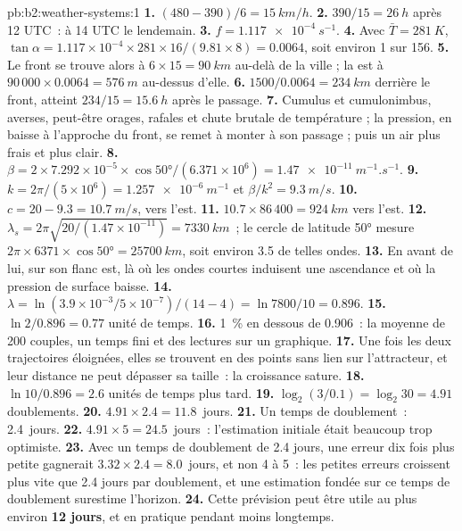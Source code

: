 \begin{solution}{pb:b2:weather-systems:1}
\textbf{1.} $(480 - 390)/6 = \qty{15}{km/h}$.
\textbf{2.} $390/15 = \qty{26}{h}$ après 12 UTC~: à 14 UTC le lendemain.
\textbf{3.} $f = \qty{1.117e-4}{s^{-1}}$.
\textbf{4.} Avec $\bar T = \qty{281}{K}$, $\tan\alpha = 1.117 \times 10^{-4} \times 281 \times
16/(9.81 \times 8) = 0.0064$, soit environ 1 sur 156.
\textbf{5.} Le front se trouve alors à $6 \times 15 = \qty{90}{km}$ au-delà de la ville ; la  est
à $90\,000 \times 0.0064 = \qty{576}{m}$ au-dessus d'elle.
\textbf{6.} $1500/0.0064 = \qty{234}{km}$ derrière le front, atteint $234/15 = \qty{15.6}{h}$ après
le passage.
\textbf{7.} Cumulus et cumulonimbus, averses, peut-être orages, rafales et chute brutale de
température ; la pression, en baisse à l'approche du front, se remet à monter à son passage ; puis
un air plus frais et plus clair.
\textbf{8.} $\beta = 2 \times 7.292 \times 10^{-5} \times \cos\ang{50}/(6.371 \times 10^6) =
\qty{1.47e-11}{m^{-1}.s^{-1}}$.
\textbf{9.} $k = 2\pi/(5 \times 10^6) = \qty{1.257e-6}{m^{-1}}$ et $\beta/k^2 = \qty{9.3}{m/s}$.
\textbf{10.} $c = 20 - 9.3 = \qty{10.7}{m/s}$, vers l'est.
\textbf{11.} $10.7 \times 86\,400 = \qty{924}{km}$ vers l'est.
\textbf{12.} $\lambda_s = 2\pi\sqrt{20/(1.47 \times 10^{-11})} = \qty{7330}{km}$~; le cercle de
latitude \ang{50} mesure $2\pi \times 6371 \times \cos\ang{50} = \qty{25700}{km}$, soit environ 3.5
de telles ondes.
\textbf{13.} En avant de lui, sur son flanc est, là où les ondes courtes induisent une ascendance et où la
pression de surface baisse.
\textbf{14.} $\lambda = \ln(3.9 \times 10^{-3}/5 \times 10^{-7})/(14 - 4) = \ln 7800/10 = 0.896$.
\textbf{15.} $\ln 2/0.896 = 0.77$ unité de temps.
\textbf{16.} \qty{1}{\percent} en dessous de 0.906~: la moyenne de 200 couples, un temps fini et des lectures sur
un graphique.
\textbf{17.} Une fois les deux trajectoires éloignées, elles se trouvent en des points sans lien sur l'attracteur, et
leur distance ne peut dépasser sa taille~: la croissance sature.
\textbf{18.} $\ln 10/0.896 = 2.6$ unités de temps plus tard.
\textbf{19.} $\log_2(3/0.1) = \log_2 30 = 4.91$ doublements.
\textbf{20.} $4.91 \times 2.4 = 11.8$~jours.
\textbf{21.} Un temps de doublement~: 2.4~jours.
\textbf{22.} $4.91 \times 5 = 24.5$~jours~: l'estimation initiale était beaucoup trop optimiste.
\textbf{23.} Avec un temps de doublement de 2.4 jours, une erreur dix fois plus petite gagnerait $3.32 \times 2.4
= 8.0$~jours, et non 4 à 5~: les petites erreurs croissent plus vite que 2.4 jours par doublement, et une
estimation fondée sur ce temps de doublement surestime l'horizon.
\textbf{24.} Cette prévision peut être utile au plus environ \textbf{12 jours}, et en pratique
pendant moins longtemps.
\end{solution}
